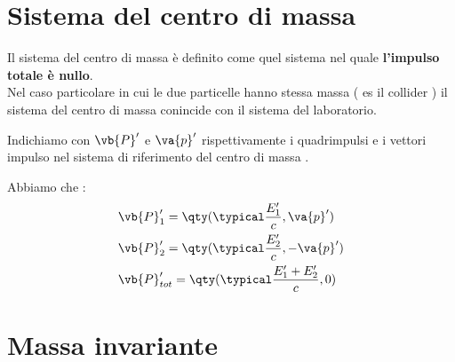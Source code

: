 \documentclass[a4paper, 12pt, twoside]{report}
\begin{document}
\section{Sistema del centro di massa}
Il sistema del centro di massa è definito come quel sistema nel quale \textbf{l'impulso totale è nullo}.\\
Nel caso particolare in cui le due particelle hanno stessa massa ( es il collider ) il sistema del centro di massa conincide con il sistema del laboratorio. \\
\begin{tcolorbox}[colback=red!5!white,colframe=red!50!black,title=ATTENZIONE !]
        Indichiamo con $\vb{P}^{\prime}$ e $\va{p}^{\prime}$ rispettivamente i quadrimpulsi e i vettori impulso nel sistema di riferimento del centro di massa .
\end{tcolorbox}
\newpage
Abbiamo che : 
\begin{align*}
    &\vb{P}^{\prime}_1 = \qty(\typical \frac{E^{\prime}_1}{c}, \va{p}^{\prime}) \\
    &\vb{P}^{\prime}_2 = \qty(\typical \frac{E^{\prime}_2}{c}, -\va{p}^{\prime}) \\
    &\vb{P}^{\prime}_{tot} = \qty(\typical \frac{E^{\prime}_1 +  E^{\prime}_2}{c}, 0)
\end{align*}
\section{Massa invariante}
\end{document}
